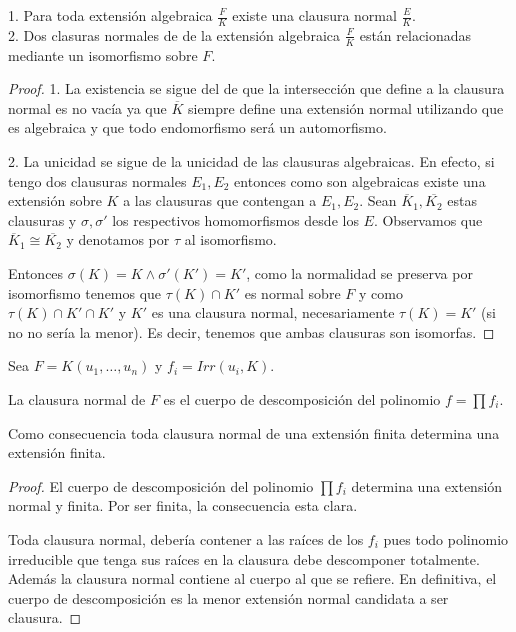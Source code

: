 \begin{proposition}
1. Para toda extensión algebraica $\frac{F}{K}$ existe una clausura normal $\frac{E}{K}$. \\
2. Dos clasuras normales de de la extensión algebraica $\frac{F}{K}$ están relacionadas mediante un isomorfismo sobre $F$.  
\end{proposition}
\begin{proof}
1. La existencia se sigue del de que la intersección que define a la clausura normal es no vacía ya que $\overline{K}$ siempre define una extensión normal utilizando que es algebraica y que todo endomorfismo será un automorfismo.

2. La unicidad se sigue de la unicidad de las clausuras algebraicas. En efecto, si tengo dos clausuras normales $E_1,E_2$ entonces como son algebraicas existe una extensión sobre $K$ a las clausuras que contengan a $E_1,E_2$. Sean $\overline{K}_1,\overline{K_2}$ estas clausuras y $\sigma,\sigma'$ los respectivos homomorfismos desde los $E$. Observamos que  $\overline{K}_1 \cong \overline{K_2}$ y denotamos por $\tau$ al isomorfismo. 

Entonces $\sigma(K) = K \land \sigma'(K') = K'$, como la normalidad se preserva por isomorfismo tenemos que $\tau(K) \cap K'$ es normal sobre $F$ y como $\tau(K) \cap K' \cap K'$ y $K'$ es una clausura normal, necesariamente $\tau(K) = K'$ (si no no sería la menor). Es decir, tenemos que ambas clausuras son isomorfas. 
\end{proof}

\begin{proposition}
Sea $F = K(u_1,\ldots,u_n)$ y $f_i = Irr(u_i,K)$.

La clausura normal de $F$ es el cuerpo de descomposición del polinomio $f = \prod f_i$. 

Como consecuencia toda clausura normal de una extensión finita determina una extensión finita. 
\end{proposition}
\begin{proof}
El cuerpo de descomposición del polinomio $\prod f_i$ determina una extensión normal y finita. Por ser finita, la consecuencia esta clara. 

Toda clausura normal, debería contener a las raíces de los $f_i$ pues todo polinomio irreducible que tenga sus raíces en la clausura debe descomponer totalmente. Además la clausura normal contiene al cuerpo al que se refiere. En definitiva, el cuerpo de descomposición es la menor extensión normal candidata a ser clausura. 
\end{proof}

